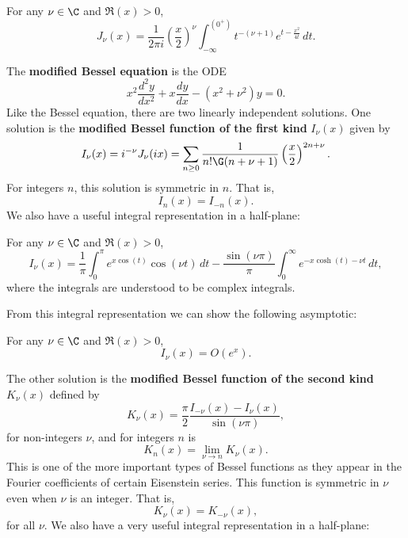     \begin{proposition}
      For any $\nu \in \C$ and $\Re(x) > 0$,
      \[
        J_{\nu}(x) = \frac{1}{2\pi i}\left(\frac{x}{2}\right)^{\nu}\int_{-\infty}^{(0^{+})}t^{-(\nu+1)}e^{t-\frac{x^{2}}{4t}}\,dt.
      \]
    \end{proposition}

    The \textbf{modified Bessel equation} is the ODE
    \[
      x^{2}\frac{d^{2}y}{dx^{2}}+x\frac{dy}{dx}-(x^{2}+\nu^{2})y = 0.
    \]
    Like the Bessel equation, there are two linearly independent solutions. One solution is the \textbf{modified Bessel function of the first kind} $I_{\nu}(x)$ given by
    \[
      I_{\nu}(x) = i^{-\nu}J_{\nu}(ix) = \sum_{n \ge 0}\frac{1}{n!\G(n+\nu+1)}\left(\frac{x}{2}\right)^{2n+\nu}.
    \]
    For integers $n$, this solution is symmetric in $n$. That is,
    \[
      I_{n}(x) = I_{-n}(x).
    \]
    We also have a useful integral representation in a half-plane:

    \begin{proposition}\label{prop:integral_representation_I-Bessel_function}
      For any $\nu \in \C$ and $\Re(x) > 0$,
      \[
        I_{\nu}(x) = \frac{1}{\pi}\int_{0}^{\pi}e^{x\cos(t)}\cos(\nu t)\,dt-\frac{\sin(\nu\pi)}{\pi}\int_{0}^{\infty}e^{-x\cosh(t)-\nu t}\,dt,
      \]
      where the integrals are understood to be complex integrals.
    \end{proposition}

    From this integral representation we can show the following asymptotic:

    \begin{lemma}\label{lem:exponential_growth_I-Bessel_function}
      For any $\nu \in \C$ and $\Re(x) > 0$,
      \[
        I_{\nu}(x) = O(e^{x}).
      \]
    \end{lemma}

    The other solution is the \textbf{modified Bessel function of the second kind} $K_{\nu}(x)$ defined by
    \[
      K_{\nu}(x) = \frac{\pi}{2}\frac{I_{-\nu}(x)-I_{\nu}(x)}{\sin(\nu\pi)},
    \]
    for non-integers $\nu$, and for integers $n$ is
    \[
      K_{n}(x)= \lim_{\nu \to n}K_{\nu}(x).
    \]
    This is one of the more important types of Bessel functions as they appear in the Fourier coefficients of certain Eisenstein series. This function is symmetric in $\nu$ even when $\nu$ is an integer. That is,
    \[
      K_{\nu}(x) = K_{-\nu}(x),
    \]
    for all $\nu$. We also have a very useful integral representation in a half-plane:


